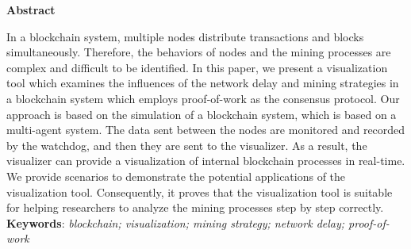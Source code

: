 \thispagestyle{plain}
\vspace*{\fill}
    \begin{center}
        \Large
        \textbf{Abstract}
    \end{center}
    
    \vspace{1cm}
    
    In a blockchain system, multiple nodes distribute transactions and blocks simultaneously. Therefore, the behaviors of nodes and the mining processes are complex and difficult to be identified. In this paper, we present a visualization tool which examines the influences of the network delay and mining strategies in a blockchain system which employs proof-of-work as the consensus protocol. Our approach is based on the simulation of a blockchain system, which is based on a multi-agent system. The data sent between the nodes are monitored and recorded by the watchdog, and then they are sent to the visualizer. As a result, the visualizer can provide a visualization of internal blockchain processes in real-time. We provide scenarios to demonstrate the potential applications of the visualization tool. Consequently, it proves that the visualization tool is suitable for helping researchers to analyze the mining processes step by step correctly. \\
    
    \textbf{Keywords}: \textit{blockchain; visualization; mining strategy; network delay; proof-of-work}
\vspace*{\fill}

